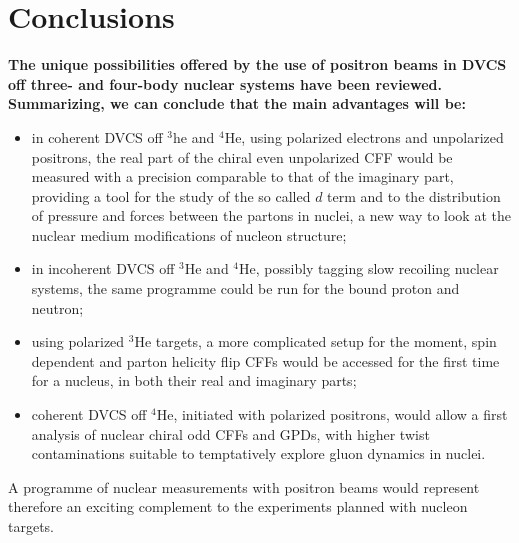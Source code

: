 \documentclass[times, twoside]{PosWhiPap}
\begin{document}
\section*{Conclusions}
{\bf
The unique possibilities offered by the use of positron beams in DVCS off three- and four-body nuclear systems have been reviewed. Summarizing, we can conclude that the main advantages will be:
\begin{itemize}
    \item in coherent DVCS off $^3$he and $^4$He, using polarized electrons and unpolarized positrons,
    the real part of the chiral even unpolarized CFF would be measured with a precision comparable to that of the imaginary part, providing a tool for the study of the so called $d$ term and to the distribution of pressure and forces between the partons in nuclei, a new way to look at the nuclear medium modifications of nucleon structure; 
    \item in incoherent DVCS off $^3$He and $^4$He, possibly tagging slow recoiling nuclear systems, the same programme could be run for the bound proton and neutron;
    \item using polarized $^3$He targets, a more complicated setup for the moment, spin dependent and parton helicity flip CFFs would be accessed for the first time for a nucleus, in both their real and imaginary parts;
    \item coherent DVCS off $^4$He, initiated with polarized positrons, would allow a first analysis of nuclear chiral odd CFFs and GPDs, with higher twist contaminations suitable to temptatively explore gluon dynamics in nuclei.
\end{itemize}
A programme of nuclear measurements with positron beams would represent therefore an exciting complement to the experiments planned with nucleon targets. 
}












\end{document}

